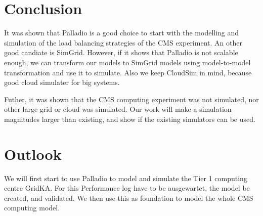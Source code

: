 \begin{center}
\label{compare}
\end{center}

\chapter{Conclusion}

It was shown that Palladio is a good choice to start with the modelling and simulation of the load balancing strategies of the CMS experiment. An other good candiate is SimGrid. However, if it shows that Palladio is not scalable enough, we can transform our models to SimGrid models using model-to-model transformation and use it to simulate. Also we keep CloudSim in mind, because good cloud simulater for big systems. 

Futher, it was shown that the CMS computing experiment was not simulated, nor other large grid or cloud was simulated. Our work will make a simulation magnitudes larger than existing,  and show if the existing simulators can be used.

\chapter{Outlook}
We will first start to use Palladio to model and simulate the Tier 1 computing centre GridKA. 
For this Performance log have to be ausgewartet, the model be created, and validated.
We then use this as foundation to model the whole CMS computing model.

